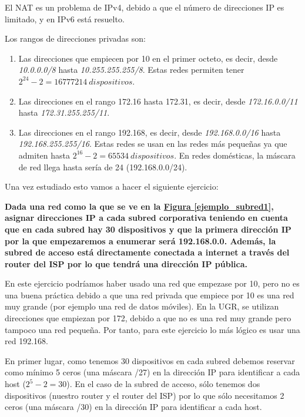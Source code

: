 \documentclass[10pt,a4paper,spanish]{report}
\begin{document}
El NAT es un problema de IPv4, debido a que el número de direcciones IP es limitado, y en IPv6 está resuelto.

Los rangos de direcciones privadas son:
\begin{enumerate}[\color{tema4}{$\bigstar$}]
  \item Las direcciones que empiecen por 10 en el primer octeto, es decir, desde \textit{\textcolor{tema4}{10.0.0.0/8}} hasta \textit{\textcolor{tema4}{10.255.255.255/8}}. Estas redes permiten tener $2^{24} - 2 = 16777214 ~ dispositivos$.
  \item Las direcciones en el rango 172.16 hasta 172.31, es decir, desde \textit{\textcolor{tema4}{172.16.0.0/11}} hasta \textit{\textcolor{tema4}{172.31.255.255/11}}.
  \item Las direcciones en el rango 192.168, es decir, desde \textit{\textcolor{tema4}{192.168.0.0/16}} hasta \textit{\textcolor{tema4}{192.168.255.255/16}}. Estas redes se usan en las redes más pequeñas ya que admiten hasta $2^{16} - 2 = 65534 ~ dispositivos$. En redes domésticas, la máscara de red llega hasta sería de 24 (192.168.0.0/24).
\end{enumerate}

Una vez estudiado esto vamos a hacer el siguiente ejercicio:

\textbf{Dada una red como la que se ve en la \hyperref[ejemplo_subred1]{Figura \ref*{ejemplo_subred1}}, asignar direcciones IP a cada subred corporativa teniendo en cuenta que en cada subred hay 30 dispositivos y que la primera dirección IP por la que empezaremos a enumerar será 192.168.0.0. Además, la subred de acceso está directamente conectada a internet a través del router del ISP por lo que tendrá una dirección IP pública.}

En este ejercicio podríamos haber usado una red que empezase por 10, pero no es una buena práctica debido a que una red privada que empiece por 10 es una red muy grande (por ejemplo una red de datos móviles). En la UGR, se utilizan direcciones que empiezan por 172, debido a que no es una red muy grande pero tampoco una red pequeña. Por tanto, para este ejercicio lo más lógico es usar una red 192.168.

En primer lugar, como tenemos 30 dispositivos en cada subred debemos reservar como mínimo 5 ceros (una máscara /27) en la dirección IP para identificar a cada host ($2^5 - 2 = 30$). En el caso de la subred de acceso, sólo tenemos dos dispositivos (nuestro router y el router del ISP) por lo que sólo necesitamos 2 ceros (una máscara /30) en la dirección IP para identificar a cada host. 
\end{document}
